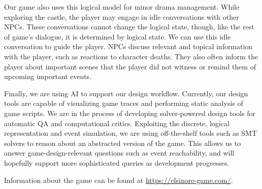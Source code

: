Our game also uses this logical model for minor drama management.
While exploring the castle, the player may engage in idle conversations with other NPCs.
These conversations cannot change the logical state, though, like the rest of game's dialogue, it is determined by logical state.
We can use this idle conversation to guide the player.
NPCs discuss relevant and topical information with the player, such as reactions to character deaths.
They also often inform the player about important scenes that the player did not witness or remind them of upcoming important events.

Finally, we are using AI to support our design workflow.
Currently, our design tools are capable of visualizing game traces and performing static analysis of game scripts.
We are in the process of developing solver-powered design tools for automatic QA and computational critics.
Exploiting the discrete, logical representation and event simulation, we are using off-the-shelf tools such as SMT solvers to reason about an abstracted version of the game.
This allows us to answer game-design-relevant questions such as event reachability, and will hopefully support more sophisticated queries as development progresses.

Information about the game can be found at \url{https://elsinore-game.com/}.